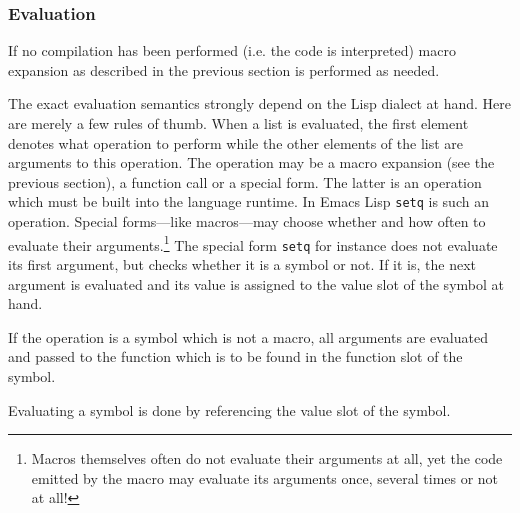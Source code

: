 \documentclass[a4paper,10pt,twoside]{report}
\newcommand{\el}{Emacs Lisp}
\newcommand{\fun}[1]{\texttt{#1}}
\begin{document}
\subsubsection{Evaluation}
\label{subsubsec:evaluation}

If no compilation has been performed (i.e. the code is interpreted) macro
expansion as described in the previous section is performed as needed.

The exact evaluation semantics strongly depend on the Lisp dialect at hand.
Here are merely a few rules of thumb.  When a list is evaluated, the first
element denotes what operation to perform while the other elements of the list
are arguments to this operation.  The operation may be a macro expansion (see
the previous section), a function call or a special form.  The latter is an
operation which must be built into the language runtime.  In \el{} \fun{setq} is
such an operation.  Special forms---like macros---may choose whether and how
often to evaluate their arguments.\footnote{Macros themselves often do not
  evaluate their arguments at all, yet the code emitted by the macro may
  evaluate its arguments once, several times or not at all!}  The special form
\fun{setq} for instance does not evaluate its first argument, but checks whether
it is a symbol or not.  If it is, the next argument is evaluated and its value
is assigned to the value slot of the symbol at hand.

If the operation is a symbol which is not a macro, all arguments are evaluated
and passed to the function which is to be found in the function slot of the
symbol.

Evaluating a symbol is done by referencing the value slot of the symbol.




\end{document}
